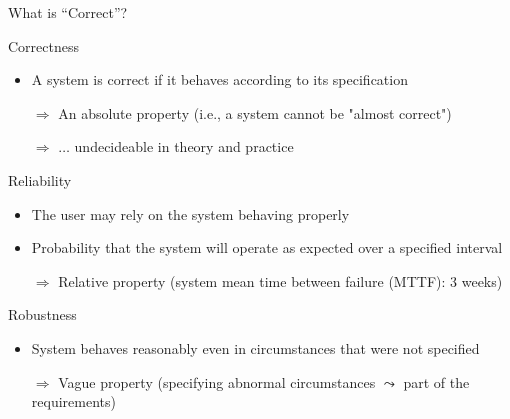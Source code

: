 \begin{frame}{What is ``Correct''?}

  \begin{block}{Correctness}
    \begin{itemize}
    \item A system is correct if it behaves according to its specification
    \item[$\Rightarrow$] An absolute property (i.e., a system cannot be "almost
      correct")
    \item[$\Rightarrow$] $\ldots$ undecideable in theory and practice 
    \end{itemize}
  \end{block}

  \begin{block}{Reliability}
    \begin{itemize}
    \item The user may rely on the system behaving properly
    \item Probability that the system will operate as expected over a specified
      interval 
    \item[$\Rightarrow$] Relative property (system mean time between failure
      {\small(MTTF)}: 3 weeks)
    \end{itemize}
  \end{block}

  \begin{block}{Robustness}
    \begin{itemize}
    \item System behaves reasonably even in circumstances that were not
      specified
    \item[$\Rightarrow$] Vague property {\small(specifying abnormal
        circumstances $\leadsto$ part of the requirements)}

    \end{itemize}
  \end{block}
\end{frame}
